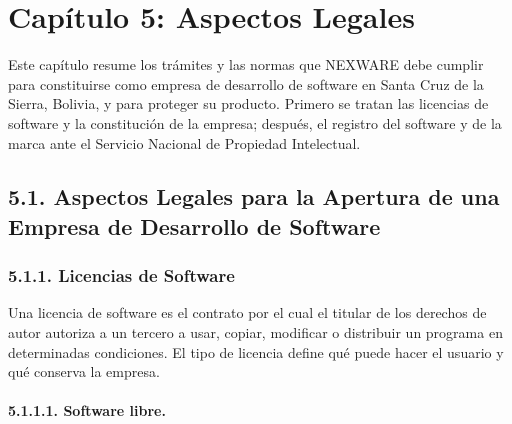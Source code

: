 
\newpage
\section{Capítulo 5: Aspectos Legales}\label{cap:legal}


Este capítulo resume los trámites y las normas que NEXWARE debe cumplir para constituirse como empresa de desarrollo de software en Santa Cruz de la Sierra, Bolivia, y para proteger su producto. Primero se tratan las licencias de software y la constitución de la empresa; después, el registro del software y de la marca ante el Servicio Nacional de Propiedad Intelectual.

\subsection{5.1. Aspectos Legales para la Apertura de una Empresa de Desarrollo de Software}

\subsubsection{5.1.1. Licencias de Software}

Una licencia de software es el contrato por el cual el titular de los derechos de autor autoriza a un tercero a usar, copiar, modificar o distribuir un programa en determinadas condiciones. El tipo de licencia define qué puede hacer el usuario y qué conserva la empresa.

\paragraph{5.1.1.1. Software libre.}

